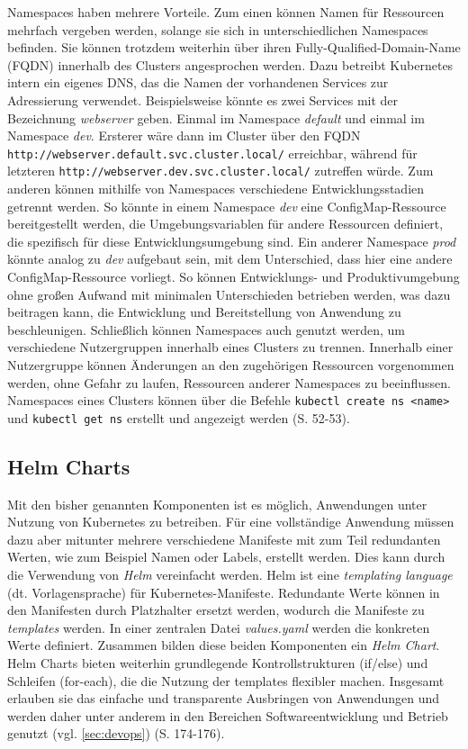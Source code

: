 \documentclass[11pt,a4paper]{article}
\begin{document}
Namespaces haben mehrere Vorteile. Zum einen können Namen für Ressourcen mehrfach vergeben werden,
solange sie sich in unterschiedlichen Namespaces befinden. Sie können trotzdem weiterhin
über ihren Fully-Qualified-Domain-Name (FQDN) innerhalb des Clusters angesprochen werden.
Dazu betreibt Kubernetes intern ein eigenes DNS, das die Namen
der vorhandenen Services zur Adressierung verwendet.
Beispielsweise könnte es zwei Services mit der Bezeichnung \emph{webserver} geben.
Einmal im Namespace \emph{default} und einmal im Namespace \emph{dev}.
Ersterer wäre dann im Cluster über den FQDN \lstinline|http://webserver.default.svc.cluster.local/|
erreichbar, während für letzteren \lstinline|http://webserver.dev.svc.cluster.local/| zutreffen würde.
Zum anderen können mithilfe von Namespaces verschiedene Entwicklungsstadien getrennt werden.
So könnte in einem Namespace \emph{dev} eine ConfigMap-Ressource bereitgestellt werden,
die Umgebungsvariablen für andere Ressourcen definiert, die spezifisch für diese
Entwicklungsumgebung sind. Ein anderer Namespace \emph{prod} könnte analog zu \emph{dev}
aufgebaut sein, mit dem Unterschied, dass hier eine andere ConfigMap-Ressource vorliegt.
So können Entwicklungs- und Produktivumgebung ohne großen Aufwand mit minimalen Unterschieden betrieben
werden, was dazu beitragen kann, die Entwicklung und Bereitstellung von Anwendung zu beschleunigen.
Schließlich können Namespaces auch genutzt werden, um verschiedene Nutzergruppen innerhalb eines Clusters
zu trennen. Innerhalb einer Nutzergruppe können Änderungen an den zugehörigen Ressourcen vorgenommen werden,
ohne Gefahr zu laufen, Ressourcen anderer Namespaces zu beeinflussen.
Namespaces eines Clusters können über die Befehle \lstinline|kubectl create ns <name>| und
\lstinline|kubectl get ns| erstellt und angezeigt werden \cite{Schmeling_Dargatz_2022} (S. 52-53).

\subsection{Helm Charts}
Mit den bisher genannten Komponenten ist es möglich, Anwendungen unter Nutzung von
Kubernetes zu betreiben. Für eine vollständige Anwendung müssen dazu aber mitunter
mehrere verschiedene Manifeste mit zum Teil redundanten Werten, wie zum Beispiel
Namen oder Labels, erstellt werden.
Dies kann durch die Verwendung von \emph{Helm} vereinfacht werden. %
Helm ist eine \emph{templating language} (dt. Vorlagensprache) für
Kubernetes-Manifeste. Redundante Werte können in den Manifesten
durch Platzhalter ersetzt werden, wodurch die Manifeste zu \emph{templates} werden.
In einer zentralen Datei \emph{values.yaml} werden die konkreten Werte definiert.
Zusammen bilden diese beiden Komponenten ein \emph{Helm Chart}.
Helm Charts bieten weiterhin grundlegende Kontrollstrukturen (if/else) und Schleifen (for-each),
die die Nutzung der templates flexibler machen.
Insgesamt erlauben sie das einfache und transparente Ausbringen von Anwendungen
und werden daher unter anderem in den Bereichen Softwareentwicklung und Betrieb genutzt
(vgl. \ref{sec:devops}) \cite{Schmeling_Dargatz_2022} (S. 174-176).
\end{document}
